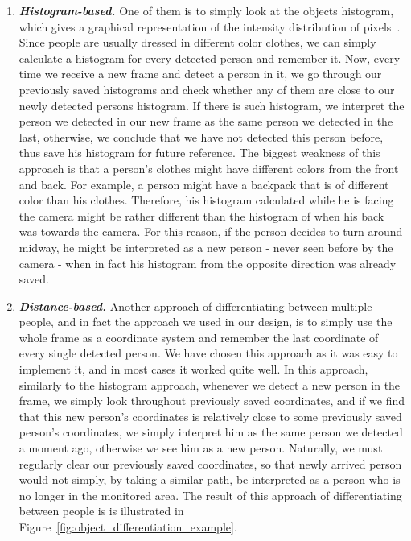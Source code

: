 \begin{enumerate}
\item \textit{\textbf{Histogram-based.}} One of them is to simply look at the objects histogram, which gives a graphical representation of the intensity distribution of pixels~\cite{histogram_1}. Since people are usually dressed in different color clothes, we can simply calculate a histogram for every detected person and remember it. Now, every time we receive a new frame and detect a person in it, we go through our previously saved histograms and check whether any of them are close to our newly detected persons histogram. If there is such histogram, we interpret the person we detected in our new frame as the same person we detected in the last, otherwise, we conclude that we have not detected this person before, thus save his histogram for future reference. The biggest weakness of this approach is that a person's clothes might have different colors from the front and back. For example, a person might have a backpack that is of different color than his clothes. Therefore, his histogram calculated while he is facing the camera might be rather different than the histogram of when his back was towards the camera. For this reason, if the person decides to turn around midway, he might be interpreted as a new person - never seen before by the camera - when in fact his histogram from the opposite direction was already saved. 

\item \textit{\textbf{Distance-based.}} Another approach of differentiating between multiple people, and in fact the approach we used in our design, is to simply use the whole frame as a coordinate system and remember the last coordinate of every single detected person. We have chosen this approach as it was easy to implement it, and in most cases it worked quite well. In this approach, similarly to the histogram approach, whenever we detect a new person in the frame, we simply look throughout previously saved coordinates, and if we find that this new person's coordinates is relatively close to some previously saved person's coordinates, we simply interpret him as the same person we detected a moment ago, otherwise we see him as a new person. Naturally, we must regularly clear our previously saved coordinates, so that newly arrived person would not simply, by taking a similar path, be interpreted as a person who is no longer in the monitored area. The result of this approach of differentiating between people is is illustrated in Figure~\ref{fig:object_differentiation_example}.
\end{enumerate}

